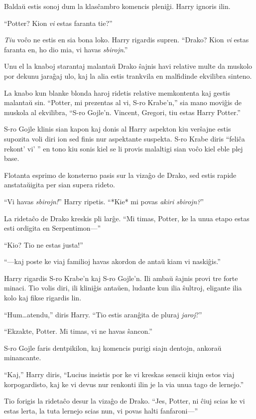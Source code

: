 Baldaŭ estis sonoj dum la klasĉambro komencis pleniĝi. Harry ignoris ilin.

``Potter? Kion \emph{vi} estas faranta tie?''

\emph{Tiu} voĉo ne estis en sia bona loko. Harry rigardis supren. ``Drako?
Kion \emph{vi} estas faranta en, ho dio mia, vi havas \emph{sbirojn}.''

Unu el la knaboj starantaj malantaŭ Drako ŝajnis havi relative multe
da muskolo por dekunu jaraĝaj ulo, kaj la alia estis trankvila en
malfidinde ekvilibra sinteno.

La knabo kun blanke blonda haroj ridetis relative memkontenta kaj
gestis malantaŭ sin. ``Potter, mi prezentas al vi, S-ro Krabe'n,'' sia
mano moviĝis de muskola al ekvilibra, ``S-ro Gojle'n. Vincent,
Gregori, tiu estas Harry Potter.''

S-ro Gojle klinis sian kapon kaj donis al Harry aspekton kiu verŝajne
estis supozita voli diri ion sed finis nur aspektante suspekta. S-ro
Krabe diris ``feliĉa rekont' vi' '' en tono kiu sonis kiel se li
provis malaltigi sian voĉo kiel eble plej base.

Flotanta esprimo de konsterno pasis sur la vizaĝo de Drako, sed estis
rapide anstataŭigita per sian supera rideto.

``Vi havas \emph{sbirojn!}'' Harry ripetis. ``*Kie* mi povas \emph{akiri sbirojn?}''

La ridetaĉo de Drako kreskis pli larĝe. ``Mi timas, Potter, ke la unua
etapo estas esti ordigita en Serpentimon—''

``Kio? Tio ne estas justa!''

``—kaj poste ke viaj familioj havas akordon de antaŭ kiam vi
naskiĝis.''

Harry rigardis S-ro Krabe'n kaj S-ro Gojle'n. Ili ambaŭ ŝajnis provi
tre forte minaci. Tio volis diri, ili kliniĝis antaŭen, ludante kun
ilia ŝultroj, eligante ilia kolo kaj fikse rigardis lin.

``Hum\ldots atendu,'' diris Harry. ``Tio estis aranĝita de pluraj \emph{jaroj}?''

``Ekzakte, Potter. Mi timas, vi ne havas ŝancon.''

S-ro Gojle faris dentpikilon, kaj komencis purigi siajn dentojn, ankoraŭ minancante.

``Kaj,'' Harry diris, ``Lucius insistis por ke vi kreskas senscii
kiujn estos viaj korpogardisto, kaj ke vi devus nur renkonti ilin je
la via unua tago de lernejo.''

Tio forigis la ridetaĉo desur la vizaĝo de Drako. ``Jes, Potter, ni
ĉiuj scias ke vi estas lerta, la tuta lernejo scias nun, vi povas
halti fanfaroni—''

